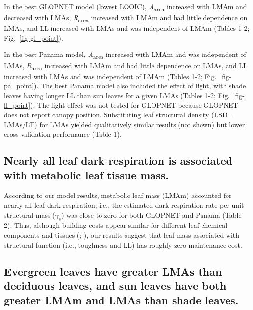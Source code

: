 \documentclass[
  12pt,
  letterpaper,
  DIV=11,
  numbers=noendperiod]{scrartcl}
\begin{document}
In the best GLOPNET model (lowest LOOIC), \emph{A}\textsubscript{area}
increased with LMAm and decreased with LMAs,
\emph{R}\textsubscript{area} increased with LMAm and had little
dependence on LMAs, and LL increased with LMAs and was independent of
LMAm (Tables 1-2; Fig.~\ref{fig-gl_point}).

In the best Panama model, \emph{A}\textsubscript{area} increased with
LMAm and was independent of LMAs, \emph{R}\textsubscript{area} increased
with LMAm and had little dependence on LMAs, and LL increased with LMAs
and was independent of LMAm (Tables 1-2; Fig.~\ref{fig-pa_point}). The
best Panama model also included the effect of light, with shade leaves
having longer LL than sun leaves for a given LMAs (Tables 1-2;
Fig.~\ref{fig-ll_point}). The light effect was not tested for GLOPNET
because GLOPNET does not report canopy position. Substituting leaf
structural density (LSD = LMAs/LT) for LMAs yielded qualitatively
similar results (not shown) but lower cross-validation performance
(Table 1).

\subsection{Nearly all leaf dark respiration is associated with
metabolic leaf tissue
mass.}\label{nearly-all-leaf-dark-respiration-is-associated-with-metabolic-leaf-tissue-mass.}

According to our model results, metabolic leaf mass (LMAm) accounted for
nearly all leaf dark respiration; i.e., the estimated dark respiration
rate per-unit structural mass (\(\gamma_s\)) was close to zero for both
GLOPNET and Panama (Table 2). Thus, although building costs appear
similar for different leaf chemical components and tissues
(;
), our results suggest
that leaf mass associated with structural function (i.e., toughness and
LL) has roughly zero maintenance cost.

\subsection{Evergreen leaves have greater LMAs than deciduous leaves,
and sun leaves have both greater LMAm and LMAs than shade
leaves.}\label{evergreen-leaves-have-greater-lmas-than-deciduous-leaves-and-sun-leaves-have-both-greater-lmam-and-lmas-than-shade-leaves.}
\end{document}
